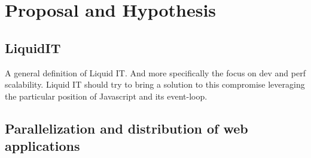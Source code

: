 \section{Proposal and Hypothesis}

\subsection{LiquidIT}

A general definition of Liquid IT.
And more specifically the focus on dev and perf scalability.
Liquid IT should try to bring a solution to this compromise leveraging the particular position of Javascript and its event-loop.


\subsection{Parallelization and distribution of web applications}


\subsection{}




                                    \endinput


Some links I NEED to put :
--------------------------

https://glyph.twistedmatrix.com/2014/02/unyielding.html
http://calculist.org/blog/2011/12/14/why-coroutines-wont-work-on-the-web/


Some chunks I might find useful later :
---------------------------------------

\cit{No matter how great the talent or efforts, some things just take time. You can't produce a baby in one month by getting nine women pregnant.}
{Warren Buffett}

A good example of declarative sentence in everyday world : in case of fire, 
the elevators don't work -> you understand that you need to take the stairs.

The purpose of explicit synchronization is to manage the timing of side-effects in the presence of parallelism. 

